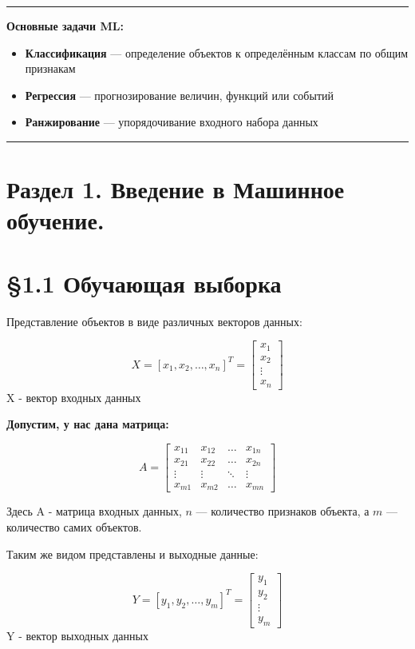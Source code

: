 \vspace{1em}
\noindent\rule{\linewidth}{0.4pt}

\vspace{1em}
\textbf{Основные задачи ML:}
\begin{itemize}
    \item \textbf{Классификация} — определение объектов к определённым классам по общим признакам
    \item \textbf{Регрессия} — прогнозирование величин, функций или событий
    \item \textbf{Ранжирование} — упорядочивание входного набора данных
\end{itemize}

\vspace{1em}
\noindent\rule{\linewidth}{0.4pt}
\section*{Раздел 1. Введение в Машинное обучение.}
\section*{\S 1.1 Обучающая выборка}

Представление объектов в виде различных векторов данных:

\[
    X = [x_1, x_2, \ldots, x_n]^T =  \begin{bmatrix}
x_1 \\
x_2 \\
\vdots \\
x_n
\end{bmatrix}
\]
X - вектор входных данных

\textbf{Допустим, у нас дана матрица:}

\[A =
\begin{bmatrix}
x_{11} & x_{12} & \ldots & x_{1n} \\
x_{21} & x_{22} & \ldots & x_{2n} \\
\vdots & \vdots & \ddots & \vdots \\
x_{m1} & x_{m2} & \ldots & x_{mn}
\end{bmatrix}
\]
\raggedright
Здесь A - матрица входных данных, \( n \) — количество признаков объекта, а \( m \) — количество самих объектов.

Таким же видом представлены и выходные данные:

\[
    Y = [y_1, y_2, \ldots , y_m ]^T = \begin{bmatrix}
                                       y_1 \\
                                       y_2 \\
                                       \vdots \\
                                       y_m
                                       \end{bmatrix}
\]
Y - вектор выходных данных

